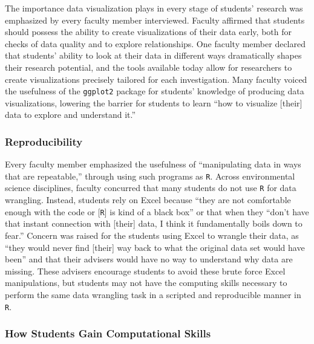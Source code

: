 \documentclass[12pt]{article}
\begin{document}
\quad The importance data visualization plays in every stage of students'
research was emphasized by every faculty member interviewed. Faculty affirmed
that students should possess the ability to create visualizations of their data
early, both for checks of data quality and to explore relationships. One faculty
member declared that students' ability to look at their data in different ways
dramatically shapes their research potential, and the tools available today 
allow for researchers to create visualizations precisely tailored for each
investigation. Many faculty voiced the usefulness of the \texttt{ggplot2} 
\citep{ggplot} package for students' knowledge of producing data visualizations,
lowering the barrier for students to learn ``how to visualize [their] data to
explore and understand it.'' 

\subsubsection{Reproducibility}  

\quad Every faculty member emphasized the usefulness of ``manipulating data in
ways that are repeatable,'' through using such programs as \texttt{R}. Across
environmental science disciplines, faculty concurred that many students do not
use \texttt{R} for data wrangling. Instead, students rely on Excel because 
``they are not comfortable enough with the code or [\texttt{R}] is kind of a 
black box'' or that when they ``don't have that instant connection with [their]
data, I think it fundamentally boils down to fear.'' Concern was raised for the
students using Excel to wrangle their data, as ``they would never find [their]
way back to what the original data set would have been'' and that their advisers
would have no way to understand why data are missing. These advisers encourage
students to avoid these brute force Excel manipulations, but students may not
have the computing skills necessary to perform the same data wrangling task in a
scripted and reproducible manner in \texttt{R}.

\subsubsection{How Students Gain Computational Skills}
\end{document}
